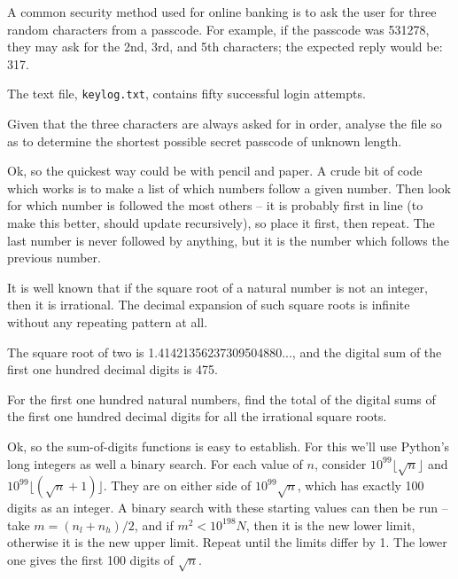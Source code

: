 




\ans{---}



A common security method used for online banking is to ask the user for three random characters from a passcode. For example, if the passcode was 531278, they may ask for the 2nd, 3rd, and 5th characters; the expected reply would be: 317.

The text file, \verb"keylog.txt", contains fifty successful login attempts.

Given that the three characters are always asked for in order, analyse the file so as to determine the shortest possible secret passcode of unknown length.

Ok, so the quickest way could be with pencil and paper.  A crude bit of code which works is to make a list of which numbers
follow a given number.  Then look for which number is followed the most others -- it is probably first in line (to make this better, should update recursively), so place it first, then repeat.  The last number is never followed by anything, but it is
the number which follows the previous number.




It is well known that if the square root of a natural number is not an integer, then it is irrational. The decimal expansion of such square roots is infinite without any repeating pattern at all.

The square root of two is 1.41421356237309504880..., and the digital sum of the first one hundred decimal digits is 475.

For the first one hundred natural numbers, find the total of the digital sums of the first one hundred decimal digits for all the irrational square roots.

Ok, so the sum-of-digits functions is easy to establish.  For this we'll use Python's long integers as well a binary search.
For each value of $n$, consider $10^{99} \lfloor \sqrt n \rfloor$ and $10^{99} \lfloor (\sqrt{n}+1) \rfloor$.  They are on either side of $10^{99}\sqrt n$, which has exactly 100 digits as an integer.  A binary search with these starting values can then be run -- take $m = (n_l+n_h)/2$, and if $m^2 < 10^{198}N$, then it is the new lower limit, otherwise it is the new upper limit.  Repeat until the limits differ by 1.  The lower one gives the first 100 digits of $\sqrt n$.


